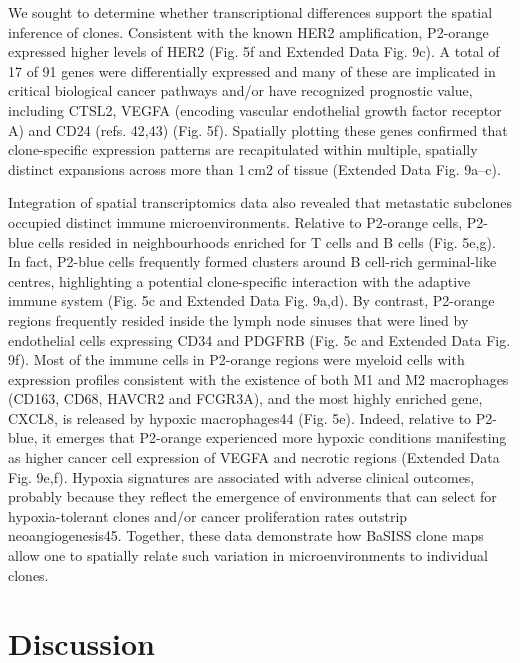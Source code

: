 We sought to determine whether transcriptional differences support the spatial inference of clones. Consistent with the known HER2 amplification, P2-orange expressed higher levels of HER2 (Fig. 5f and Extended Data Fig. 9c). A total of 17 of 91 genes were differentially expressed and many of these are implicated in critical biological cancer pathways and/or have recognized prognostic value, including CTSL2, VEGFA (encoding vascular endothelial growth factor receptor A) and CD24 (refs. 42,43) (Fig. 5f). Spatially plotting these genes confirmed that clone-specific expression patterns are recapitulated within multiple, spatially distinct expansions across more than 1 cm2 of tissue (Extended Data Fig. 9a–c).

Integration of spatial transcriptomics data also revealed that metastatic subclones occupied distinct immune microenvironments. Relative to P2-orange cells, P2-blue cells resided in neighbourhoods enriched for T cells and B cells (Fig. 5e,g). In fact, P2-blue cells frequently formed clusters around B cell-rich germinal-like centres, highlighting a potential clone-specific interaction with the adaptive immune system (Fig. 5c and Extended Data Fig. 9a,d). By contrast, P2-orange regions frequently resided inside the lymph node sinuses that were lined by endothelial cells expressing CD34 and PDGFRB (Fig. 5c and Extended Data Fig. 9f). Most of the immune cells in P2-orange regions were myeloid cells with expression profiles consistent with the existence of both M1 and M2 macrophages (CD163, CD68, HAVCR2 and FCGR3A), and the most highly enriched gene, CXCL8, is released by hypoxic macrophages44 (Fig. 5e). Indeed, relative to P2-blue, it emerges that P2-orange experienced more hypoxic conditions manifesting as higher cancer cell expression of VEGFA and necrotic regions (Extended Data Fig. 9e,f). Hypoxia signatures are associated with adverse clinical outcomes, probably because they reflect the emergence of environments that can select for hypoxia-tolerant clones and/or cancer proliferation rates outstrip neoangiogenesis45. Together, these data demonstrate how BaSISS clone maps allow one to spatially relate such variation in microenvironments to individual clones.

\section{Discussion}

